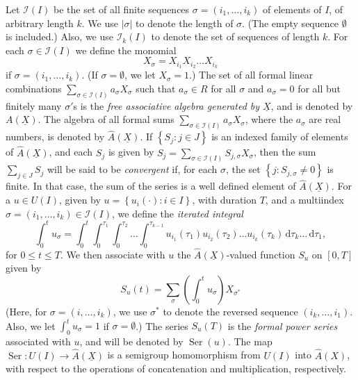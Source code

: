 \documentclass[leqno]{article}
\theoremstyle{plain}
\newcommand{\dd}{\,\mathrm{d}}
\newcommand{\Ser}{\operatorname{Ser}}
\begin{document}
Let $\mathcal{I}(I)$ be the set of all finite sequences $\sigma=\left(i_{1}, \ldots, i_{k}\right)$ of elements of $I$, of arbitrary length $k$. We use $|\sigma|$ to denote the length of $\sigma$. (The empty sequence $\emptyset$ is included.) Also, we use $\mathcal{I}_{k}(I)$ to denote the set of sequences of length $k$. For each $\sigma \in \mathcal{I}(I)$ we define the monomial
\begin{equation}
	X_{\sigma}=X_{i_{1}} X_{i_{2}} \ldots X_{i_{k}}
\end{equation}
if $\sigma=\left(i_{1}, \ldots, i_{k}\right)$. (If $\sigma=\emptyset$, we let $X_{\sigma}=1$.) 
The set of all formal linear combinations $\sum_{\sigma \in \mathcal{I}(I)} a_{\sigma} X_{\sigma}$ such that $a_{\sigma} \in R$ for all $\sigma$ and $a_{\sigma}=0$ for all but finitely many $\sigma'$s is the \emph{free associative algebra generated by $\underline{X}$}, and is denoted by $A(\underline{X})$. 
The algebra of all formal sums $\sum_{\sigma \in \mathcal{I}(I)} a_{\sigma} X_{\sigma}$, where the $a_\sigma$ are real numbers, is denoted by $\hat{A}(\underline{X})$. 
If $\left\{S_{j}: j \in J\right\}$ is an indexed family of elements of $\hat{A}(\underline{X})$, and each $S_{j}$ is given by $S_{j}=\sum_{\sigma \in \mathcal{I}(I)} S_{j,\sigma} X_{\sigma}$, then the sum $\sum_{j \in J} S_{j}$ will be said to be \emph{convergent} if, for each $\sigma$, the set $\left\{j: S_{j, \sigma} \neq 0\right\}$ is finite. 
In that case, the sum of the series is a well defined element of $\hat{A}(\underline{X})$. 
For a $u \in U(I)$, given by $u=\left\{u_{i}(\cdot): i \in I\right\}$, with duration $T$, and a multiindex $\sigma=\left(i_{1}, \ldots, i_{k}\right) \in \mathcal{I}(I)$, we define the \emph{iterated integral}
\begin{equation}
	\int_{0}^{t} u_{\sigma}=\int_{0}^{t} \int_{0}^{\tau_1} \int_{0}^{\tau_2} \ldots \int_{0}^{\tau_{k-1}} u_{i_{1}}\left(\tau_{1}\right) u_{i_{2}}\left(\tau_{2}\right) \ldots u_{i_{k}}\left(\tau_{k}\right) \dd \tau_{k} \ldots \dd \tau_1,
\end{equation}
for $0 \leq t \leq T$. 
We then associate with $u$ the $\hat{A}(\underline{X})$-valued function $S_{u}$ on $[0,T]$ given by
\begin{equation}
	S_{u}(t)=\sum_{\sigma}\left(\int_{0}^{t} u_{\sigma}\right) X_{\sigma^*}
\end{equation}
(Here, for $\sigma=\left(i, \ldots, i_{k}\right)$, we use $\sigma^{*}$ to denote the reversed sequence $\left(i_{k}, \ldots, i_{1}\right)$. 
Also, we let $\int_{0}^{t} u_{\sigma}=1$ if $\sigma=\emptyset$.)
The series $S_{u}(T)$ is the \emph{formal power series} associated with $u$, and will be denoted by $\Ser(u)$. The map $\Ser: U(I) \rightarrow \hat{A}(\underline{X})$ is a semigroup homomorphism from $U(I)$ into $\hat{A}(X)$, with respect to the operations of concatenation and multiplication, respectively.
\end{document}
